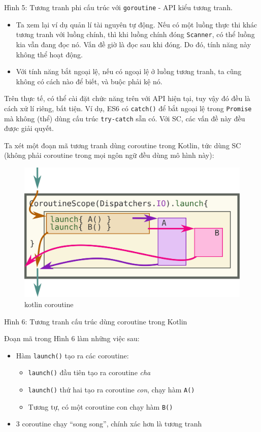 \documentclass[
]{article}
\begin{document}
Hình 5: Tương tranh phi cấu trúc với \texttt{goroutine} - API kiểu tương
tranh.

\begin{itemize}
\item
  Ta xem lại ví dụ quản lí tài nguyên tự động. Nếu có một luồng thực thi
  khác tương tranh với luồng chính, thì khi luồng chính đóng
  \texttt{Scanner}, có thể luồng kia vẫn đang đọc nó. Vấn đề giờ là đọc
  sau khi đóng. Do đó, tính năng này không thể hoạt động.
\item
  Với tính năng bắt ngoại lệ, nếu có ngoại lệ ở luồng tương tranh, ta
  cũng không có cách nào để biết, và buộc phải kệ nó.
\end{itemize}

Trên thực tế, có thể cài đặt chức năng trên với API hiện tại, tuy vậy đó
đều là cách xử lí riêng, bất tiện. Ví dụ, ES6 có \texttt{catch()} để bắt
ngoại lệ trong \texttt{Promise} mà không (thể) dùng cấu trúc
\texttt{try-catch} sẵn có. Với SC, các vấn đề này đều được giải quyết.

Ta xét một đoạn mã tương tranh dùng coroutine trong Kotlin, tức dùng SC
(không phải coroutine trong mọi ngôn ngữ đều dùng mô hình này):

\begin{figure}
\centering
\includegraphics{../images/kotlin-coroutine.svg}
\caption{kotlin coroutine}
\end{figure}

Hình 6: Tương tranh cấu trúc dùng coroutine trong Kotlin

Đoạn mã trong Hình 6 làm những việc sau:

\begin{itemize}
\item
  Hàm \texttt{launch()} tạo ra các coroutine:

  \begin{itemize}
    \item
    \texttt{launch()} đầu tiên tạo ra coroutine \emph{cha}
  \item
    \texttt{launch()} thứ hai tạo ra coroutine \emph{con}, chạy hàm
    \texttt{A()}
  \item
    Tương tự, có một coroutine con chạy hàm \texttt{B()}
  \end{itemize}
\item
  3 coroutine chạy ``song song'', chính xác hơn là tương tranh
\end{itemize}
\end{document}
